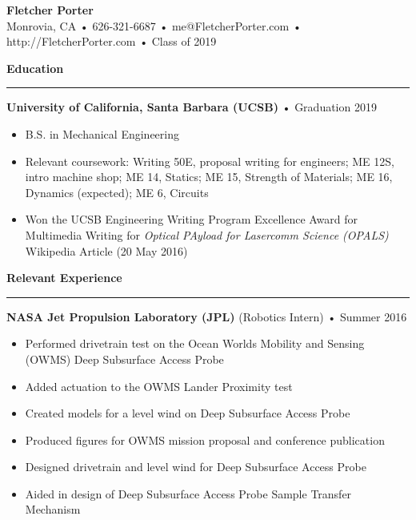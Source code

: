 \documentclass[12pt, oneside]{article}
\newcommand{\titlestyle}[1] {
	{\fontsize{50pt}{1em}\selectfont \bf \textcolor{new_red}{#1}} \\
}
\newcommand{\headingstyleJobs}[1] {
	{\fontsize{20pt}{1em}\selectfont \bf \textcolor{new_red}{#1}}
	\textcolor{new_red}{\rule{3.25in}{0.5pt}} \vspace{3pt}
}
\newcommand{\infostyle}[1] {
	{\fontsize{9pt}{1em}\selectfont #1} \\ \vspace{10pt}
}
\newcommand{\jobtitle}[3] {
	{\bf #1} {#2} • {#3} \vspace{-10pt} \\
}
\begin{document}
\begin{flushleft}


\titlestyle{Fletcher Porter}
\infostyle{Monrovia, CA • 626-321-6687 • me@FletcherPorter.com • http://FletcherPorter.com • Class of 2019}


\headingstyleJobs{Education}


\jobtitle{University of California, Santa Barbara (UCSB)}{}{Graduation 2019}
\begin{itemize}
	\item B.S. in Mechanical Engineering
	\item Relevant coursework: Writing 50E, proposal writing for engineers; ME 12S, intro machine shop; ME 14, Statics; ME 15, Strength of Materials; ME 16, Dynamics (expected); ME 6, Circuits
	\item Won the UCSB Engineering Writing Program Excellence Award for Multimedia Writing for \textit{Optical PAyload for Lasercomm Science (OPALS)} Wikipedia Article (20 May 2016)
\end{itemize}


\headingstyleJobs{Relevant Experience}

\jobtitle{NASA Jet Propulsion Laboratory (JPL)}{(Robotics Intern)}{Summer 2016}
\begin{itemize}
	\item Performed drivetrain test on the Ocean Worlds Mobility and Sensing (OWMS) Deep Subsurface Access Probe
	\item Added actuation to the OWMS Lander Proximity test
	\item Created models for a level wind on Deep Subsurface Access Probe
	\item Produced figures for OWMS mission proposal and conference publication
	\item Designed drivetrain and level wind for Deep Subsurface Access Probe
	\item Aided in design of Deep Subsurface Access Probe Sample Transfer Mechanism
\end{itemize}


\end{flushleft}
\end{document}
